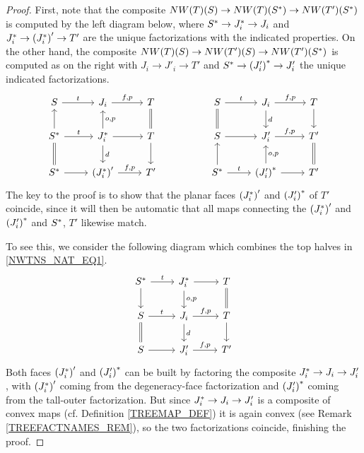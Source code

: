 \documentclass{hha}
\theoremstyle{definition} %
\begin{document}
\begin{proof}
	First, note that the composite
	$NW(T)({S})
	\to 
	NW(T)({S^{\**}})
	\to 
	NW(T')({S^{\**}})$
	is computed by the left diagram below,
	where
	$S^{\**} \to J^{\**}_i \to J_i$
	and 
	$J^{\**}_i \to \left(J_i^{\**}\right)' \to T'$
	are the unique factorizations with the indicated properties.
	On the other hand, the composite
	$NW(T)(S)
	\to 
	NW(T')(S)
	\to 
	NW(T')(S^{\**})$
	is computed as on the right
	with 
	$J_i \to J'_i \to T'$ and
	$S^{\**} \to \left(J_i'\right)^{\**} \to J'_i$
	the unique indicated factorizations.
\begin{equation}\label{NWTNS_NAT_EQ1}
\begin{tikzcd}
	S \ar{r}{t} 
&
	J_i \ar{r}{f,p} 
&
	T \ar[equal]{d}
&&%
	S \ar{r}{t} \ar[equal]{d}
&
	J_i \ar{r}{f,p} \ar{d}{d}
&
	T \ar{d}
\\
	S^{\**} \ar{u} \ar{r}{t} \ar[equal]{d}
&
	J^{\**}_i \ar{r} \arrow{u}[swap]{o,p} \arrow{d}{d}
&
	T \ar{d}
&&%
	S \ar{r}
&
	J'_i \arrow{r}{f,p}
&
	T' \ar[equal]{d}
\\
	S^{\**} \ar{r}
&
	\left(J_i^{\**}\right)' \arrow{r}{f,p}
&
	T'
&&%
	S^{\**} \arrow{r}{t} \ar{u}
&
	\left(J_i'\right)^{\**} \ar{r} \arrow{u}[swap]{o,p}
&
	T'
\end{tikzcd}
\end{equation}
	The key to the proof is to show
	that the planar faces 
	$\left(J_i^{\**}\right)'$ and
	$\left(J_i'\right)^{\**}$
	of $T'$
	coincide, since it will then be automatic that all maps connecting the
	$\left(J_i^{\**}\right)'$ and
	$\left(J_i'\right)^{\**}$
	and $S^{\**}$, $T'$
	likewise match.

	To see this, we consider the following diagram
	which combines the top halves in \eqref{NWTNS_NAT_EQ1}.
\begin{equation}
\begin{tikzcd}
	S^{\**} \ar{r}{t} \ar{d}
&
	J^{\**}_i \ar{r} \ar{d}{o,p}
&
	T \ar[equal]{d}
\\
	S  \ar{r}{t} \ar[equal]{d}
&
	J_i \ar{r}{f,p}  \ar{d}{d}
&
	T \ar{d}
\\
	S \ar{r}
&
	J_i' \ar{r}{f,p}
&
	T'
\end{tikzcd}
\end{equation}
	Both faces  
	$\left(J^{\**}_i\right)'$ and 
	$\left(J'_i\right)^{\**}
	$
	can be built by factoring
	the composite 
	$J^{\**}_i \to J_i \to J_i'$,
	with 
	$\left(J^{\**}_i\right)'$ 
	coming from the 
	degeneracy-face factorization
	and 
	$\left(J'_i\right)^{\**}$
	coming from the 
	tall-outer factorization.
	But since 
	$J^{\**}_i \to J_i \to J_i'$
	is a composite of convex maps (cf. Definition \ref{TREEMAP_DEF})
    it is again convex (see Remark \ref{TREEFACTNAMES_REM}), 
	so the two factorizations coincide, 
	finishing the proof.
\end{proof}
\end{document}
